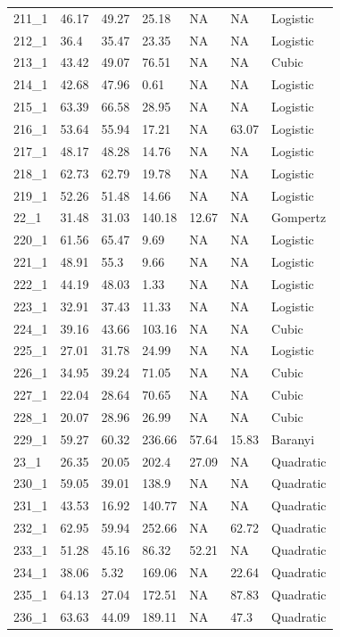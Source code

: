\documentclass[titlepage]{article}
\begin{document}
\begin{longtable}{lllllll}
211\_1 & 46.17 & 49.27 & 25.18 & NA & NA & Logistic \\
212\_1 & 36.4 & 35.47 & 23.35 & NA & NA & Logistic \\
213\_1 & 43.42 & 49.07 & 76.51 & NA & NA & Cubic \\
214\_1 & 42.68 & 47.96 & 0.61 & NA & NA & Logistic \\
215\_1 & 63.39 & 66.58 & 28.95 & NA & NA & Logistic \\
216\_1 & 53.64 & 55.94 & 17.21 & NA & 63.07 & Logistic \\
217\_1 & 48.17 & 48.28 & 14.76 & NA & NA & Logistic \\
218\_1 & 62.73 & 62.79 & 19.78 & NA & NA & Logistic \\
219\_1 & 52.26 & 51.48 & 14.66 & NA & NA & Logistic \\
22\_1 & 31.48 & 31.03 & 140.18 & 12.67 & NA & Gompertz \\
220\_1 & 61.56 & 65.47 & 9.69 & NA & NA & Logistic \\
221\_1 & 48.91 & 55.3 & 9.66 & NA & NA & Logistic \\
222\_1 & 44.19 & 48.03 & 1.33 & NA & NA & Logistic \\
223\_1 & 32.91 & 37.43 & 11.33 & NA & NA & Logistic \\
224\_1 & 39.16 & 43.66 & 103.16 & NA & NA & Cubic \\
225\_1 & 27.01 & 31.78 & 24.99 & NA & NA & Logistic \\
226\_1 & 34.95 & 39.24 & 71.05 & NA & NA & Cubic \\
227\_1 & 22.04 & 28.64 & 70.65 & NA & NA & Cubic \\
228\_1 & 20.07 & 28.96 & 26.99 & NA & NA & Cubic \\
229\_1 & 59.27 & 60.32 & 236.66 & 57.64 & 15.83 & Baranyi \\
23\_1 & 26.35 & 20.05 & 202.4 & 27.09 & NA & Quadratic \\
230\_1 & 59.05 & 39.01 & 138.9 & NA & NA & Quadratic \\
231\_1 & 43.53 & 16.92 & 140.77 & NA & NA & Quadratic \\
232\_1 & 62.95 & 59.94 & 252.66 & NA & 62.72 & Quadratic \\
233\_1 & 51.28 & 45.16 & 86.32 & 52.21 & NA & Quadratic \\
234\_1 & 38.06 & 5.32 & 169.06 & NA & 22.64 & Quadratic \\
235\_1 & 64.13 & 27.04 & 172.51 & NA & 87.83 & Quadratic \\
236\_1 & 63.63 & 44.09 & 189.11 & NA & 47.3 & Quadratic \\

\end{longtable}
\end{document}
